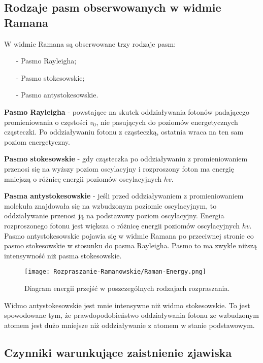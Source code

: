 \subsection{Rodzaje pasm obserwowanych w widmie Ramana}
W widmie Ramana są obserwowane trzy rodzaje pasm:
\begin{itemize}
	\item[-]{Pasmo Rayleigha};
	\item[-]{Pasmo stokesowskie};
	\item[-]{Pasmo antystokesowskie}.
\end{itemize}

\textbf{Pasmo Rayleigha} - powstające na skutek oddziaływania fotonów padającego promieniowania o częstości $v_{0}$, nie pasujących do poziomów energetycznych cząsteczki. Po oddziaływaniu fotonu z cząsteczką, ostatnia wraca na ten sam poziom energetyczny.

\textbf{Pasmo stokesowskie} - gdy cząsteczka po oddziaływaniu z promieniowaniem przenosi się na wyższy poziom oscylacyjny i rozproszony foton ma energię mniejszą o różnicę energii poziomów oscylacyjnych $hv$.

\textbf{Pasma antystokesowskie} - jeśli przed oddziaływaniem z promieniowaniem molekuła znajdowała się na wzbudzonym poziomie oscylacyjnym, to oddziaływanie przenosi ją na podstawowy poziom oscylacyjny. Energia rozproszonego fotonu jest większa o różnicę energii poziomów oscylacyjnych $hv$. Pasmo antystokesowskie pojawia się w widmie Ramana po przeciwnej stronie co pasmo stokesowskie w stosunku do pasma Rayleigha. Pasmo to ma zwykle niższą intensywność niż pasma stokesowskie.
\begin{figure}[H]
	\begin{center}
		\texttt{[image: Rozpraszanie-Ramanowskie/Raman-Energy.png]}
		\caption{Diagram energii przejść w poszczególnych rodzajach rozpraszania.}
	\end{center}
\end{figure}
Widmo antystokesowskie jest mnie intensywne niż widmo stokesowskie. To jest spowodowane tym,
że prawdopodobieństwo oddziaływania fotonu ze wzbudzonym atomem jest dużo mniejsze niż
oddziaływanie z atomem w stanie podstawowym.

\subsection{Czynniki warunkujące zaistnienie zjawiska}
